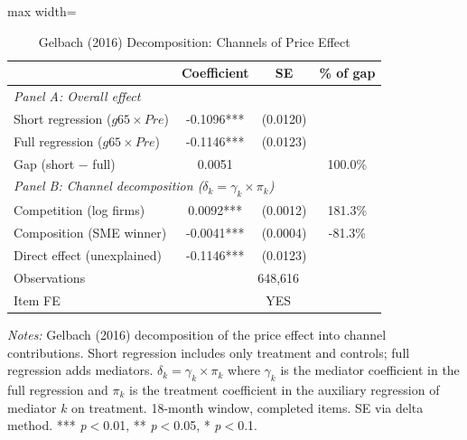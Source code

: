 \begin{table}[htbp]
\centering
\caption{Gelbach (2016) Decomposition: Channels of Price Effect}
\label{tab:mediation}
\begin{adjustbox}{max width=\textwidth}
\begin{threeparttable}
\small
\begin{tabular}{lccc}
\toprule
 & Coefficient & SE & \% of gap \\
\midrule
\multicolumn{4}{l}{\textit{Panel A: Overall effect}} \\
Short regression ($g65 \times Pre$) & -0.1096*** & (0.0120) & \\
Full regression ($g65 \times Pre$) & -0.1146*** & (0.0123) & \\
Gap (short $-$ full) & 0.0051 & & 100.0\% \\
\midrule
\multicolumn{4}{l}{\textit{Panel B: Channel decomposition ($\delta_k = \gamma_k \times \pi_k$)}} \\
Competition (log firms) & 0.0092*** & (0.0012) & 181.3\% \\
Composition (SME winner) & -0.0041*** & (0.0004) & -81.3\% \\
Direct effect (unexplained) & -0.1146*** & (0.0123) & \\
\midrule
Observations & \multicolumn{3}{c}{648,616} \\
Item FE & \multicolumn{3}{c}{YES} \\
\bottomrule
\end{tabular}
\begin{tablenotes}
\small
\item \textit{Notes:} Gelbach (2016) decomposition of the price effect into channel contributions.
Short regression includes only treatment and controls; full regression adds mediators.
$\delta_k = \gamma_k \times \pi_k$ where $\gamma_k$ is the mediator coefficient in the full regression
and $\pi_k$ is the treatment coefficient in the auxiliary regression of mediator $k$ on treatment.
18-month window, completed items. SE via delta method.
*** \textit{p}$<$0.01, ** \textit{p}$<$0.05, * \textit{p}$<$0.1.
\end{tablenotes}
\end{threeparttable}
\end{adjustbox}
\end{table}
